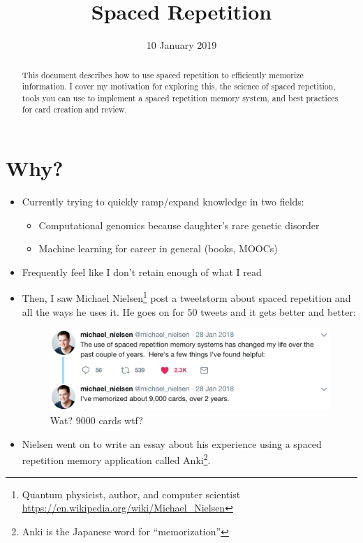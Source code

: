 \documentclass[]{tufte-handout}
\title{Spaced Repetition}
\date{10 January 2019} %
\begin{document}
\maketitle%


\begin{abstract}
\noindent
This document describes how to use spaced repetition to efficiently memorize information. I cover my motivation for exploring this, the science of spaced repetition, tools you can use to implement a spaced repetition memory system, and best practices for card creation and review.
\end{abstract}


\section{Why?}

\begin{itemize}
	\item Currently trying to quickly ramp/expand knowledge in two fields:
	\begin{itemize}
		\item Computational genomics because daughter's rare genetic disorder
		\item Machine learning for career in general (books, MOOCs)
	\end{itemize}
	\item Frequently feel like I don't retain enough of what I read
	\item Then, I saw Michael Nielsen\footnote{Quantum physicist, author, and computer scientist \url{https://en.wikipedia.org/wiki/Michael_Nielsen}} post a tweetstorm\cite{nielsen_twitter} about spaced repetition and all the ways he uses it. He goes on for 50 tweets and it gets better and better:

\begin{figure}
  \hspace{1cm} \includegraphics[width=0.7\linewidth]{nielsen_twitter.png}
  \caption{Wat? 9000 cards wtf?}
  \label{fig:twitter}
\end{figure}

	\item Nielsen went on to write an essay\cite{nielsen} about his experience using a spaced repetition memory application called Anki\footnote{Anki is the Japanese word for ``memorization''}.
\end{itemize}
\end{document}
